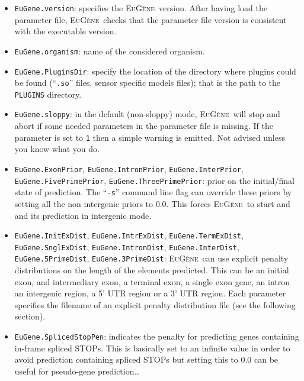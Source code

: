 \documentclass[a4paper,titlepage]{report}
\newcommand{\EuGene}{\textsc{EuG\`ene}}
\begin{document}
\begin{itemize}
\item \texttt{EuGene.version}: specifies the \EuGene \ version. 
  After having load the parameter file, \EuGene \ checks
  that the parameter file version is consistent with the executable
  version.

\item \texttt{EuGene.organism}: name of the considered organism.
   
\item \texttt{EuGene.PluginsDir}: specify the location of the directory
  where plugins could be found (``\texttt{.so}'' files, sensor specific 
  models files); that is the path to the \texttt{PLUGINS} directory.
  
  \item \texttt{EuGene.sloppy}: in the default (non-sloppy) mode, 
  \EuGene\ will stop and abort if some needed parameters in the parameter
  file is missing. If the parameter is set to \texttt{1} then a simple warning
  is emitted. Not advised unless you know what you do.
  
\item \texttt{EuGene.ExonPrior}, \texttt{EuGene.IntronPrior},
  \texttt{EuGene.InterPrior}, \texttt{EuGene.FivePri\-mePrior},
  \texttt{EuGene.ThreePrimePrior}: prior on the initial/final state of
  prediction. The ``\texttt{-s}'' command line flag can override these
  priors by setting all the non intergenic priors to $0.0$. This
  forces \EuGene\ to start and and its prediction in intergenic mode.
  
\item \texttt{EuGene.InitExDist}, \texttt{EuGene.IntrExDist},
  \texttt{EuGene.TermExDist}, \texttt{EuGene.SnglExDist},
  \texttt{EuGene.IntronDist}, \texttt{EuGene.InterDist},
  \texttt{EuGene.5PrimeDist}, \texttt{EuGene.3PrimeDist}: \EuGene\ 
  can use explicit penalty distributions on the length of the elements
  predicted. This can be an initial exon, and intermediary exon, a
  terminal exon, a single exon gene, an intron an intergenic region, a
  5' UTR region or a 3' UTR region. Each parameter specifies the
  filename of an explicit penalty distribution file (see the following section). %
  
\item \texttt{EuGene.SplicedStopPen}: indicates the penalty for
  predicting genes containing in-frame spliced STOPs. This is
  basically set to an infinite value in order to avoid prediction
  containing spliced STOPs but setting this to 0.0 can be useful for
  pseudo-gene prediction\ldots


\end{itemize}
\end{document}
